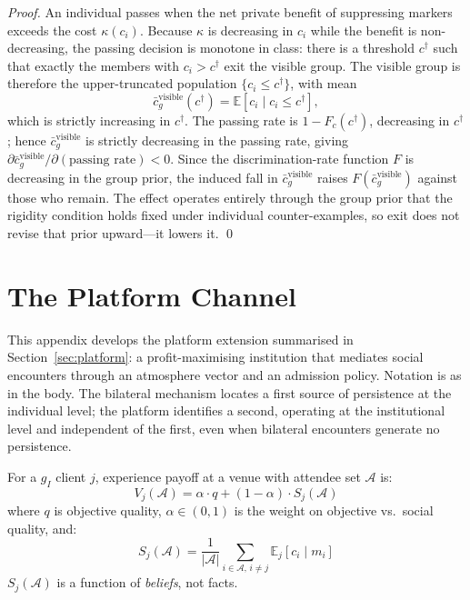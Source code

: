 \documentclass[pdflatex,sn-basic]{sn-jnl}
\newcommand{\E}{\mathbb{E}}
\newcommand{\A}{\mathcal{A}}
\theoremstyle{thmstyleone}
\numberwithin{proposition}{subsection}
\begin{document}
\begin{proof}
An individual passes when the net private benefit of suppressing
markers exceeds the cost $\kappa(c_i)$. Because $\kappa$ is decreasing in
$c_i$ while the benefit is non-decreasing, the passing decision is
monotone in class: there is a threshold $c^\dagger$ such that exactly
the members with $c_i > c^\dagger$ exit the visible group. The visible
group is therefore the upper-truncated population $\{c_i \le c^\dagger\}$,
with mean
\[
  \bar{c}_g^{\mathrm{visible}}(c^\dagger)
  = \E\!\left[c_i \mid c_i \le c^\dagger\right],
\]
which is strictly increasing in $c^\dagger$. The passing rate is
$1 - F_c(c^\dagger)$, decreasing in $c^\dagger$; hence
$\bar{c}_g^{\mathrm{visible}}$ is strictly decreasing in the passing rate,
giving $\partial \bar{c}_g^{\mathrm{visible}}/\partial(\text{passing rate}) < 0$.
Since the discrimination-rate function $F$ is decreasing in the group
prior, the induced fall in $\bar{c}_g^{\mathrm{visible}}$ raises
$F(\bar{c}_g^{\mathrm{visible}})$ against those who remain. The effect
operates entirely through the group prior that the rigidity condition
holds fixed under individual counter-examples, so exit does not revise
that prior upward---it lowers it. \qed
\end{proof}

\section{The Platform Channel}
\label{app:platform}

This appendix develops the platform extension summarised in
Section~\ref{sec:platform}: a profit-maximising institution that
mediates social encounters through an atmosphere vector and an
admission policy. Notation is as in the body. The bilateral mechanism
locates a first source of persistence at the individual level; the
platform identifies a second, operating at the institutional level and
independent of the first, even when bilateral encounters generate no
persistence.

For a $g_I$ client $j$, experience payoff at a venue with attendee
set $\A$ is:
\begin{equation}
  V_j(\A) = \alpha \cdot q + (1 - \alpha) \cdot S_j(\A)
  \label{eq:experience}
\end{equation}
where $q$ is objective quality, $\alpha \in (0,1)$ is the weight on
objective vs.\ social quality, and:
\begin{equation}
  S_j(\A) = \frac{1}{|\A|} \sum_{i \in \A,\, i \neq j}
  \E_j[c_i \mid m_i]
  \label{eq:social-quality}
\end{equation}
$S_j(\A)$ is a function of \emph{beliefs}, not facts.
\end{document}
